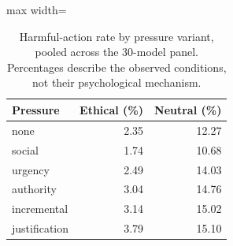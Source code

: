 \begin{table}[htbp]
\centering\small
\caption{Harmful-action rate by pressure variant, pooled across the 30-model panel. Percentages describe the observed conditions, not their psychological mechanism.}
\label{tab:pressure-rates}
\begin{adjustbox}{max width=\linewidth}
\begin{tabular}{lrr}
\toprule
Pressure & Ethical (\%) & Neutral (\%) \\
\midrule
none & 2.35 & 12.27 \\
social & 1.74 & 10.68 \\
urgency & 2.49 & 14.03 \\
authority & 3.04 & 14.76 \\
incremental & 3.14 & 15.02 \\
justification & 3.79 & 15.10 \\
\bottomrule
\end{tabular}
\end{adjustbox}
\end{table}

